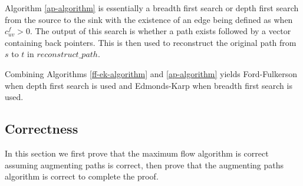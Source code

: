 \documentclass{article}
\begin{document}
Algorithm \ref{ap-algorithm} is essentially a breadth first search or depth first search from the source to the sink with the existence of an edge being defined as when $c^f_{uv}>0$. The output of this search is whether a path exists followed by a vector containing back pointers. This is then used to reconstruct the original path from $s$ to $t$ in $reconstruct\_path$.

Combining Algorithms \ref{ff-ek-algorithm} and \ref{ap-algorithm} yields Ford-Fulkerson when depth first search is used and Edmonds-Karp when breadth first search is used.

\subsection{Correctness}
In this section we first prove that the maximum flow algorithm is correct assuming augmenting paths is correct, then prove that the augmenting paths algorithm is correct to complete the proof.
\end{document}
